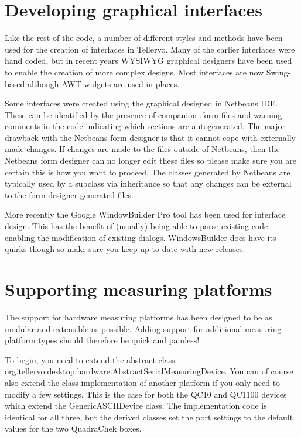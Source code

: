 \section{Developing graphical interfaces}
Like the rest of the code, a number of different styles and methods have been used for the creation of interfaces in Tellervo.  Many of the earlier interfaces were hand coded, but in recent years WYSIWYG graphical designers have been used to enable the creation of more complex designs.  Most interfaces are now Swing-based although AWT widgets are used in places.

Some interfaces were created using the graphical designed in Netbeans IDE.  These can be identified by the presence of companion .form files and warning comments in the code indicating which sections are autogenerated.  The major drawback with the Netbeans form designer is that it cannot cope with externally made changes.   If changes are made to the files outside of Netbeans, then the Netbeans form designer can no longer edit these files so please make sure you are certain this is how you want to proceed.  The classes generated by Netbeans are typically used by a subclass via inheritance so that any changes can be external to the form designer generated files. 

More recently the Google WindowBuilder Pro tool has been used for interface design.  This has the benefit of (usually) being able to parse existing code enabling the modification of existing dialogs.  WindowsBuilder does have its quirks though so make sure you keep up-to-date with new releases.

\section{Supporting measuring platforms}
\label{txtSupportingNewMeasuringPlatforms}
The support for hardware measuring platforms has been designed to be as modular and extensible as possible. Adding support for additional measuring platform types should therefore be quick and painless!  

To begin, you need to extend the abstract class org.tellervo.desktop.hardware.AbstractSerialMeasuringDevice.  You can of course also extend the class implementation of another platform if you only need to modify a few settings.  This is the case for both the QC10 and QC1100 devices which extend the GenericASCIIDevice class.  The implementation code is identical for all three, but the derived classes set the port settings to the default values for the two QuadraChek boxes.

